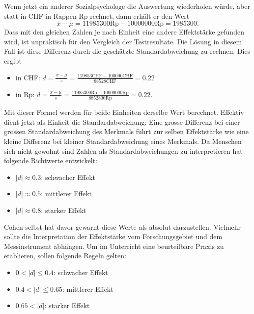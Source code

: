 \documentclass[
]{book}
\providecommand{\tightlist}{%
  \setlength{\itemsep}{0pt}\setlength{\parskip}{0pt}}
\theoremstyle{definition}
\theoremstyle{definition}
\theoremstyle{definition}
\theoremstyle{definition}
\theoremstyle{remark}
\begin{document}
Wenn jetzt ein anderer Sozialpsychologe die Auswertung wiederholen würde, aber statt in CHF in Rappen Rp rechnet, dann erhält er den Wert
\[\bar{x} - \mu = 11985300 \text{Rp} - 10000000 \text{Rp}  = 1985300.\]
Dass mit den gleichen Zahlen je nach Einheit eine andere Effektstärke gefunden wird, ist unpraktisch für den Vergleich der Testresultate. Die Lösung in diesem Fall ist diese Differenz durch die geschätzte Standardabweichung zu rechnen. Dies ergibt

\begin{itemize}
\tightlist
\item
  in CHF: \(d = \frac{\bar{x} - \mu}{s} = \frac{119853 \text{CHF} - 100000 \text{CHF}}{88528\text{CHF}}  = 0.22\)
\item
  in Rp: \(d = \frac{\bar{x} - \mu}{s} = \frac{11985300 \text{Rp} - 10000000 \text{Rp}}{8852800\text{Rp}}  = 0.22 .\)
\end{itemize}

Mit dieser Formel werden für beide Einheiten derselbe Wert berechnet. Effektiv dient jetzt als Einheit die Standardabweichung: Eine grosse Differenz bei einer grossen Standardabweichung des Merkmals führt zur selben Effektstärke wie eine kleine Differenz bei kleiner Standardabweichung eines Merkmals. Da Menschen sich nicht gewohnt sind Zahlen als Standardabweichungen zu interpretieren hat \citep{cohen1988} folgende Richtwerte entwickelt:

\begin{itemize}
\tightlist
\item
  \(|d| \approx 0.3\): schwacher Effekt
\item
  \(|d| \approx 0.5\): mittlerer Effekt
\item
  \(|d| \approx 0.8\): starker Effekt
\end{itemize}

Cohen selbst hat davor gewarnt diese Werte als absolut darzustellen. Vielmehr sollte die Interpretation der Effektstärke vom Forschungsgebiet und dem Messinstrument abhängen. Um im Unterricht eine beurteilbare Praxis zu etablieren, sollen folgende Regeln gelten:

\begin{itemize}
\tightlist
\item
  \(0 < |d| \leq 0.4\): schwacher Effekt
\item
  \(0.4 < |d| \leq 0.65\): mittlerer Effekt
\item
  \(0.65 < |d|\): starker Effekt
\end{itemize}
\end{document}
